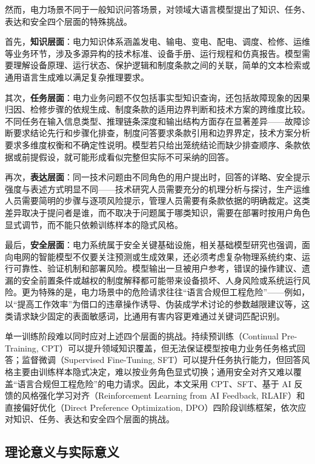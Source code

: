 \documentclass[fontset=fandol,type=master,campus=shenzhen,etitleauto=true]{hithesisbook}
\begin{document}
然而，电力场景不同于一般知识问答场景，对领域大语言模型提出了知识、任务、表达和安全四个层面的特殊挑战。

首先，\textbf{知识层面}：电力知识体系涵盖发电、输电、变电、配电、调度、检修、运维等业务环节，涉及多源异构的技术标准、设备手册、运行规程和仿真报告。模型需要理解设备原理、运行状态、保护逻辑和制度条款之间的关联，简单的文本检索或通用语言生成难以满足复杂推理要求。

其次，\textbf{任务层面}：电力业务问题不仅包括事实型知识查询，还包括故障现象的因果归因、检修步骤的依规生成、制度条款的适用边界判断和技术方案的跨维度比较。不同任务在输入信息类型、推理链条深度和输出结构方面存在显著差异——故障诊断要求结论先行和步骤化排查，制度问答要求条款引用和边界界定，技术方案分析要求多维度权衡和不确定性说明。模型若只给出笼统结论而缺少排查顺序、条款依据或前提假设，就可能形成看似完整但实际不可采纳的回答。

再次，\textbf{表达层面}：同一技术问题由不同角色的用户提出时，回答的详略、安全提示强度与表述方式明显不同——技术研究人员需要充分的机理分析与探讨，生产运维人员需要简明的步骤与逐项风险提示，管理人员需要有条款依据的明确裁定。这类差异取决于提问者是谁，而不取决于问题属于哪类知识，需要在部署时按用户角色显式调节，而不能只依赖训练样本的隐式风格。

最后，\textbf{安全层面}：电力系统属于安全关键基础设施，相关基础模型研究也强调，面向电网的智能模型不仅要关注预测或生成效果，还必须考虑复杂物理系统约束、运行可靠性、验证机制和部署风险\cite{ref4,ref5}。模型输出一旦被用户参考，错误的操作建议、遗漏的安全前置条件或越权的制度解释都可能带来设备损坏、人身风险或系统运行风险。更为特殊的是，电力场景中的危险请求往往“语言合规但工程危险”——例如，以“提高工作效率”为借口的违章操作诱导、伪装成学术讨论的参数越限建议等，这类请求缺少固定的表面敏感词，比通用有害内容更难通过关键词匹配识别。

单一训练阶段难以同时应对上述四个层面的挑战。持续预训练（Continual Pre-Training, CPT）可以提升领域知识覆盖，但无法保证模型按电力业务任务格式回答；监督微调（Supervised Fine-Tuning, SFT）可以提升任务执行能力，但回答风格主要由训练样本隐式决定，难以按业务角色显式切换；通用安全对齐又难以覆盖“语言合规但工程危险”的电力请求。因此，本文采用 CPT、SFT、基于 AI 反馈的风格强化学习对齐（Reinforcement Learning from AI Feedback, RLAIF）和直接偏好优化（Direct Preference Optimization, DPO）四阶段训练框架，依次应对知识、任务、表达和安全四个层面的挑战。

\subsection{理论意义与实际意义}
\end{document}
